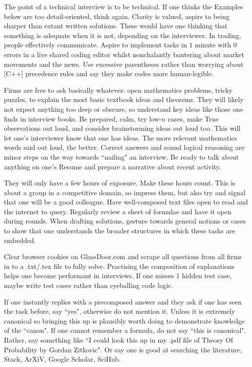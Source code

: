 The point of a technical interview is to be technical. If one thinks the Examples below are too detail-oriented, think again. Clarity is valued, aspire to being sharper than extant written solutions. These would have one thinking that something is adequate when it is not, depending on the interviewer. In trading, people effectively communicate. Aspire to implement tasks in $1$ minute with $0$ errors in a live shared coding editor whilst nonchalantly bantering about market movements and the news. Use excessive parentheses rather than worrying about [C++] precedence rules and say they make codes more human-legible.

Firms are free to ask basically whatever: open mathematics problems, tricky puzzles, to explain the most basic textbook ideas and theorems. They will likely not expect anything too deep or obscure, so understand key ideas like those one finds in interview books. Be prepared, calm, try low-$n$ cases, make True observations out loud, and consider brainstorming ideas out loud too. This will let one's interviewer know that one has ideas. The more relevant mathematics words said out loud, the better. Correct answers and sound logical reasoning are minor steps on the way towards ``nailing" an interview. Be ready to talk about anything on one's Resume and prepare a narrative about recent activity.

They will only have a few hours of exposure. Make these hours count. This is about a group in a competitive domain, so impress them, but also try and signal that one will be a good colleague. Have well-composed text files open to read and the internet to query. Regularly review a sheet of formulae and have it open during rounds. When drafting solutions, gesture towards general notions or cases to show that one understands the broader structures in which these tasks are embedded.

Clear browser cookies on GlassDoor.com and scrape all questions from all firms in to a .txt/.tex file to fully solve. Practising the composition of explanations helps one become performant in interviews. If one misses 1 hidden test case, maybe write test cases rather than eyeballing code logic.

If one instantly replies with a precomposed answer and they ask if one has seen the task before, say ``yes", otherwise do not mention it. Unless it is extremely canonical so bringing this up is plausibly worth doing to demonstrate knowledge of the ``canon". If one cannot remember a formula, do not say ``this is canonical". Rather, say something like ``I could look this up in my .pdf file of Theory Of Probability by Gordan Zitkovic". Or say one is good at searching the literature, Stack, ArXiV, Google Scholar, SciHub.

